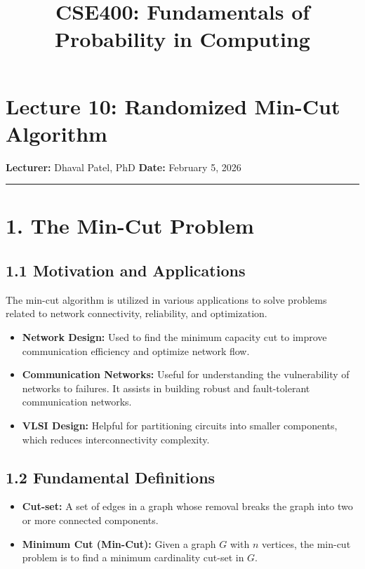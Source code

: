 \documentclass[12pt]{article}
\title{CSE400: Fundamentals of Probability in Computing}
\author{}
\date{}
\begin{document}
\maketitle

\section*{Lecture 10: Randomized Min-Cut Algorithm}

\textbf{Lecturer:} Dhaval Patel, PhD \textbf{Date:} February 5, 2026

\hrule
\vspace{0.5em}

\section*{1. The Min-Cut Problem}

\subsection*{1.1 Motivation and Applications}

The min-cut algorithm is utilized in various applications to solve problems related to network connectivity, reliability, and optimization.

\begin{itemize}
\item \textbf{Network Design:} Used to find the minimum capacity cut to improve communication efficiency and optimize network flow.

\item \textbf{Communication Networks:} Useful for understanding the vulnerability of networks to failures. It assists in building robust and fault-tolerant communication networks.

\item \textbf{VLSI Design:} Helpful for partitioning circuits into smaller components, which reduces interconnectivity complexity.
\end{itemize}

\subsection*{1.2 Fundamental Definitions}

\begin{itemize}
\item \textbf{Cut-set:} A set of edges in a graph whose removal breaks the graph into two or more connected components.

\item \textbf{Minimum Cut (Min-Cut):} Given a graph $G$ with $n$ vertices, the min-cut problem is to find a minimum cardinality cut-set in $G$.
\end{itemize}
\end{document}
